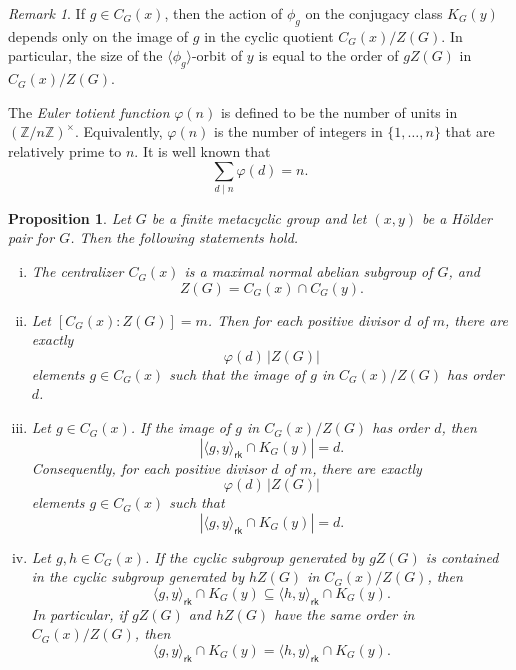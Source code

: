 \documentclass[a4paper,12pt]{article}
\newtheorem{prop}[thm]{Proposition}
\theoremstyle{definition}
\theoremstyle{remark}
\newtheorem*{rem}{Remark}
\begin{document}
\begin{rem}
If $g\in C_G(x)$, then the action of $\phi_g$ on the conjugacy class $K_G(y)$ depends only on the image of $g$ in the cyclic quotient $C_G(x)/Z(G)$. In particular, the size of the $\langle \phi_g\rangle$-orbit of $y$ is equal to the order of $gZ(G)$ in $C_G(x)/Z(G)$.
\end{rem}


The \emph{Euler totient function} $\varphi(n)$ is defined to be the number of units in $(\mathbb{Z}/n\mathbb{Z})^{\times}$. Equivalently, $\varphi(n)$ is the number of integers in $\{1,\dots, n\}$ that are relatively prime to $n$. It is well known that
$$ \sum\limits_{d\mid n}\varphi(d) = n. $$


\begin{prop}\label{prop:conditions}
  Let $G$ be a finite metacyclic group and let $(x,y)$ be a Hölder pair for $G$. Then the following statements hold.
  \begin{enumerate}[(i)]
  \item The centralizer $C_G(x)$ is a maximal normal abelian subgroup of $G$, and
  $$ Z(G)=C_G(x)\cap C_G(y). $$
  \item Let $[C_G(x):Z(G)]=m$. Then for each positive divisor $d$ of $m$, there are exactly
  $$ \varphi(d)\,|Z(G)| $$
  elements $g\in C_G(x)$ such that the image of $g$ in $C_G(x)/Z(G)$ has order $d$.
  \item Let $g\in C_G(x)$. If the image of $g$ in $C_G(x)/Z(G)$ has order $d$, then
  $$ |\langle g,y\rangle_{\mathsf{rk}}\cap K_G(y)|=d. $$
  Consequently, for each positive divisor $d$ of $m$, there are exactly
  $$ \varphi(d)\,|Z(G)| $$
  elements $g\in C_G(x)$ such that
  $$ |\langle g,y\rangle_{\mathsf{rk}}\cap K_G(y)|=d. $$
  \item Let $g,h\in C_G(x)$. If the cyclic subgroup generated by $gZ(G)$ is contained in the cyclic subgroup generated by $hZ(G)$ in $C_G(x)/Z(G)$, then
  $$ \langle g,y\rangle_{\mathsf{rk}}\cap K_G(y)\subseteq \langle h,y\rangle_{\mathsf{rk}}\cap K_G(y). $$
  In particular, if $gZ(G)$ and $hZ(G)$ have the same order in $C_G(x)/Z(G)$, then
  $$ \langle g,y\rangle_{\mathsf{rk}}\cap K_G(y)= \langle h,y\rangle_{\mathsf{rk}}\cap K_G(y). $$
  \end{enumerate}
\end{prop}
\end{document}
